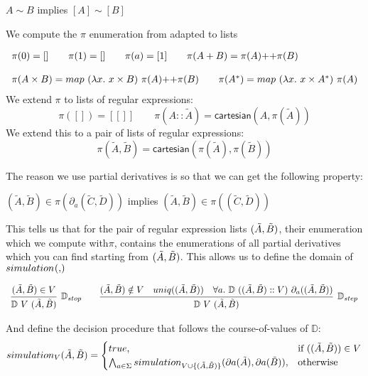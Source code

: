 \documentclass[a4paper,UKenglish,cleveref, autoref, thm-restate]{lipics-v2021}
\newcommand\mycomment[1]{}
\begin{document}
\begin{lemma}
$A \sim B$  implies $[A] \sim [B]$
\end{lemma}
\mycomment{actually the code only uses the partial one, goes directly from language containment I think}
We compute the $\pi$ enumeration from \cite{CZ01} adapted to lists
\begin{definition}[Enumeration]
  \begin{displaymath}
    \begin{array}{lll}
  \pi(0) = [] \qquad \pi(1) = [] \qquad \pi(a) = [1] \qquad \pi(A + B) = \cat{\pi(A)}{\pi(B)} \\\\
  \pi(A \times B) = \cat{\mymap{\lambda x.~x \times B}{\pi(A)}}{\pi(B)} \qquad \pi(A^*) = \mymap{\lambda x.~x \times A^*}{\pi(A)}
    \end{array}
  \end{displaymath}
We extend $\pi$ to lists of regular expressions:
\[\pi([])=[[]] \qquad \pi(A::\tilde{A}) = \mathsf{cartesian}(A,\pi(\tilde{A}))\]
We extend this to a pair of lists of regular expressions:
\[\pi(\tilde{A},\tilde{B})= \mathsf{cartesian}(\pi(\tilde{A}),\pi(\tilde{B}))\]
\end{definition}
The reason we use partial derivatives is so that we can get the following property:
\begin{lemma}[Closure]\label{lem:closure}
 $(\tilde{A},\tilde{B}) \in \pi(\partial_a(\tilde{C},\tilde{D}))$ implies  $(\tilde{A},\tilde{B}) \in \pi((\tilde{C},\tilde{D}))$ 
\end{lemma}
This tells us that for the pair of regular expression lists $(\tilde{A},\tilde{B})$, their enumeration which we compute with$\pi$, contains the enumerations of all partial derivatives which you can find starting from $(\tilde{A},\tilde{B})$. This allows us to define the domain of $\simulationb{}{}$
\begin{definition}[Domain]
  \begin{displaymath}
    \begin{array}{lll}
      \infer[\mathbb{D}_{stop}]{\domm{V}{\pder{A}{B}}}{\pder{A}{B} \in V} \qquad \infer[\mathbb{D}_{step}]{\domm{V}{\pder{A}{B}}}{\pder{A}{B} \notin V & \mathsf{uniq}(\pder{A}{B}) & \forall a.~\domm{(\pder{A}{B}::V)}{\partial_a(\pder{A}{B})}}
    \end{array}
  \end{displaymath}
\end{definition}
And define the decision procedure that follows the course-of-values of $\mathbb{D}$:
\begin{align}
\simulationb{V}{\tilde{A}}{\tilde{B}} =\begin{cases}
			\true, & \text{if }(\pder{A}{B}) \in V\\
                      \bigwedge_{a \in \Sigma}\simulationb{V \cup \{\pder{A}{B}\}}{\mypar{a}{\tilde{A}}}{\mypar{a}{\tilde{B}}}, & \text{otherwise}
		 \end{cases}
\end{align}
\end{document}
